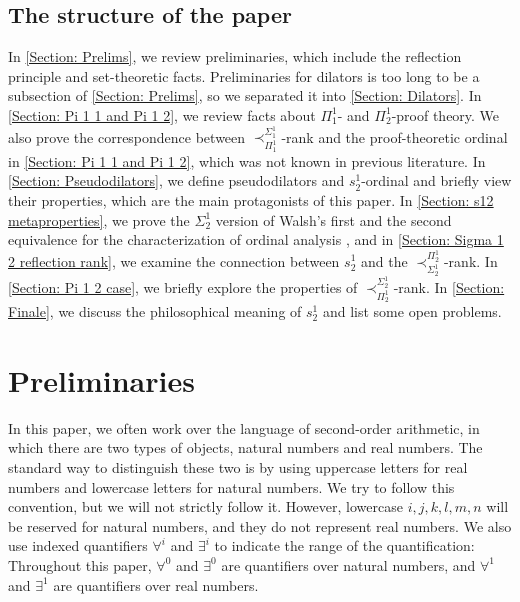 \documentclass{mhkr}
\newcommand{\added}[1]{#1}
\begin{document}
\subsection*{The structure of the paper}
In \autoref{Section: Prelims}, we review preliminaries, which include the reflection principle and set-theoretic facts.
Preliminaries for dilators \added{is} too long to be a subsection of \autoref{Section: Prelims}, so we separated it into \autoref{Section: Dilators}. In \autoref{Section: Pi 1 1 and Pi 1 2}, we review facts about $\Pi^1_1$- and $\Pi^1_2$-proof theory. We also prove the correspondence between $\prec^{\Sigma^1_1}_{\Pi^1_1}$-rank and the proof-theoretic ordinal in \autoref{Section: Pi 1 1 and Pi 1 2}, which was not known in previous literature.
In \autoref{Section: Pseudodilators}, we define pseudodilators and $s^1_2$-ordinal and briefly view their properties, which are the main protagonists of this paper. 
In \autoref{Section: s12 metaproperties}, we prove the $\Sigma^1_2$ version of Walsh's first and the second equivalence for the characterization of ordinal analysis \cite{Walsh2023characterizations}, and in \autoref{Section: Sigma 1 2 reflection rank}, we examine the connection between $s^1_2$ and the $\prec^{\Pi^1_2}_{\Sigma^1_2}$-rank.
In \autoref{Section: Pi 1 2 case}, we briefly explore the properties of $\prec^{\Sigma^1_2}_{\Pi^1_2}$-rank.
In \autoref{Section: Finale}, we discuss the philosophical meaning of $s^1_2$ and list some open problems.

\section{Preliminaries}
\label{Section: Prelims}

In this paper, we often work over the language of second-order arithmetic, in which there are two types of objects, natural numbers and real numbers. The standard way to distinguish these two is by using uppercase letters for real numbers and lowercase letters for natural numbers. \added{We try to follow this convention, but we will not strictly follow it. However, lowercase $i,j,k,l,m,n$ will be reserved for natural numbers, and they do not represent real numbers. We also use} indexed quantifiers $\forall^i$ and $\exists^i$ to indicate the range of the quantification: Throughout this paper, $\forall^0$ and $\exists^0$ are quantifiers over natural numbers, and $\forall^1$ and $\exists^1$ are quantifiers over real numbers. 
\end{document}
